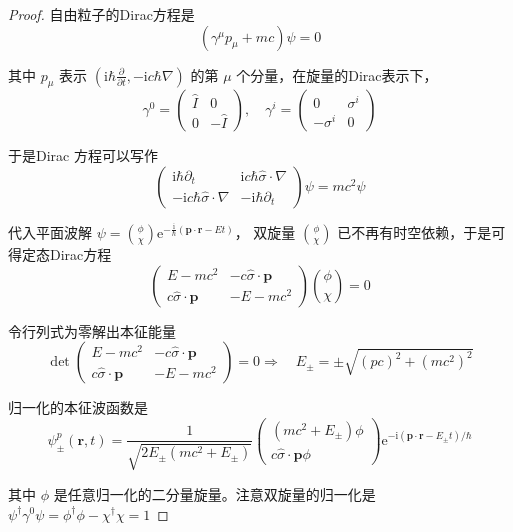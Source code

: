 \begin{proof}
    自由粒子的Dirac方程是
$$\left(\gamma^{\mu} p_{\mu}+m c\right) \psi=0$$

其中 $p_{\mu}$ 表示 $\left(\mathrm{i} \hbar \frac{\partial}{\partial t},-\mathrm{i} c \hbar \nabla\right)$ 的第 $\mu$ 个分量，在旋量的Dirac表示下，
$$\gamma^{0}=\begin{pmatrix}
\hat{I} & 0 \\
0 & -\hat{I}
\end{pmatrix}, \quad \gamma^{i}=\begin{pmatrix}
0 & \sigma^{i} \\
-\sigma^{i} & 0
\end{pmatrix}$$

于是Dirac 方程可以写作
$$\begin{pmatrix}
\mathrm{i} \hbar \partial_{t} & \mathrm{i} c \hbar \hat{\sigma} \cdot \nabla \\
-\mathrm{i} c \hbar \hat{\sigma} \cdot \nabla & -\mathrm{i} \hbar \partial_{t}
\end{pmatrix} \psi=mc^{2} \psi$$

代入平面波解 $\psi=\binom{\phi}{\chi} \mathrm{e}^{-\frac{\mathrm{i}}{\hbar}(\mathbf{p} \cdot \mathbf{r}-E t)}$，
双旋量 $\binom{\phi}{\chi}$ 已不再有时空依赖，于是可得定态Dirac方程
$$\begin{pmatrix}
E-mc^{2} & -c \hat{\sigma} \cdot \mathbf{p} \\
c \hat{\sigma} \cdot \mathbf{p} & -E-mc^{2}
\end{pmatrix}\binom{\phi}{\chi}=0$$

令行列式为零解出本征能量
$$\operatorname{det}\begin{pmatrix}
E-mc^{2} & -c \hat{\sigma} \cdot \mathbf{p} \\
c \hat{\sigma} \cdot \mathbf{p} & -E-mc^{2}
\end{pmatrix}=0 \Rightarrow \quad 
E_{\pm}= \pm \sqrt{(pc)^{2}+(mc^{2})^{2}}$$

归一化的本征波函数是
$$\psi_{\pm}^{p}(\mathbf{r}, t)=\frac{1}{\sqrt{2E_{\pm}\left(mc^{2}+E_{\pm}\right)}}
\begin{pmatrix}(mc^{2}+E_{\pm}) \phi \\ c \hat{\sigma} \cdot \mathbf{p} \phi\end{pmatrix}
\mathrm{e}^{-\mathrm{i}\left(\mathbf{p} \cdot \mathbf{r}-E_{\pm} t\right) / \hbar}$$

其中 $\phi$ 是任意归一化的二分量旋量。注意双旋量的归一化是 $\psi^{\dagger} \gamma^{0} \psi=\phi^{\dagger} \phi-\chi^{\dagger} \chi=1$


\end{proof}
